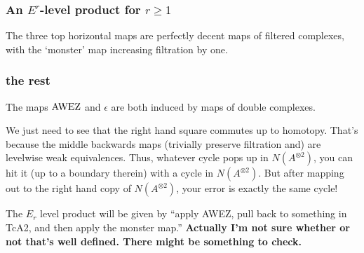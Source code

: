 \documentclass[10pt]{article}
\begin{document}
\begin{Thoughts on Adams Multiplicativity}
\subsubsection{An $E^r$-level product for $r\geq1$}
The three top horizontal maps are perfectly decent maps of filtered complexes, with the `monster' map increasing filtration by one.
\subsubsection{the rest}
The maps $\textup{AWEZ}$ and $\epsilon$ are both induced by maps of double complexes.

We just need to see that the right hand square commutes up to homotopy. That's because the middle backwards maps (trivially preserve filtration and) are levelwise weak equivalences. Thus, whatever cycle pops up in $N(A^{\otimes2})$, you can hit it (up to a boundary therein) with a cycle in $N(A^{\otimes2})$. But after mapping out to the right hand copy of $N(A^{\otimes2})$, your error is exactly the same cycle!

The $E_r$ level product will be given by ``apply AWEZ, pull back to something in TcA2, and then apply the monster map.'' \textbf{Actually I'm not sure whether or not that's well defined. There might be something to check.}





\end{Thoughts on Adams Multiplicativity}
\end{document}
